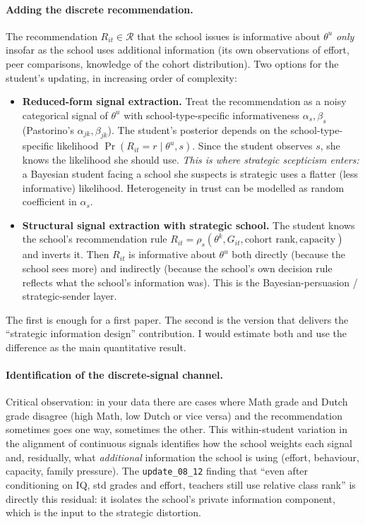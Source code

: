 \documentclass{article}
\begin{document}
\paragraph{Adding the discrete recommendation.}  The recommendation
$R_{it}\in\mathcal{R}$ that the school issues is informative about $\theta^u$
\emph{only} insofar as the school uses additional information (its own
observations of effort, peer comparisons, knowledge of the cohort
distribution).  Two options for the student's updating, in increasing order
of complexity:
\begin{itemize}[leftmargin=*]
  \item \textbf{Reduced-form signal extraction.}  Treat the recommendation as
  a noisy categorical signal of $\theta^u$ with school-type-specific
  informativeness $\alpha_s, \beta_s$ (Pastorino's $\alpha_{jk},\beta_{jk}$).
  The student's posterior depends on the school-type-specific likelihood
  $\Pr(R_{it}=r\mid \theta^u, s)$.  Since the student observes $s$, she
  knows the likelihood she should use. \emph{This is where strategic
  scepticism enters:} a Bayesian student facing a school she suspects is
  strategic uses a flatter (less informative) likelihood. Heterogeneity in
  trust can be modelled as random coefficient in $\alpha_s$.

  \item \textbf{Structural signal extraction with strategic school.}  The
  student knows the school's recommendation rule
  $R_{it} = \rho_s(\theta^k, G_{it}, \text{cohort rank}, \text{capacity})$ and
  inverts it.  Then $R_{it}$ is informative about $\theta^u$ both directly
  (because the school sees more) and indirectly (because the school's
  own decision rule reflects what the school's information was). This is
  the Bayesian-persuasion / strategic-sender layer.
\end{itemize}
The first is enough for a first paper. The second is the version that
delivers the ``strategic information design'' contribution. I would estimate
both and use the difference as the main quantitative result.

\paragraph{Identification of the discrete-signal channel.}  Critical
observation: in your data there are cases where Math grade and Dutch grade
disagree (high Math, low Dutch or vice versa) and the recommendation
sometimes goes one way, sometimes the other. This within-student variation
in the alignment of continuous signals identifies how the school weights
each signal and, residually, what \emph{additional} information the school is
using (effort, behaviour, capacity, family pressure). The \texttt{update\_08\_12}
finding that ``even after conditioning on IQ, std grades and effort, teachers
still use relative class rank'' is directly this residual: it isolates the
school's private information component, which is the input to the strategic
distortion.
\end{document}
